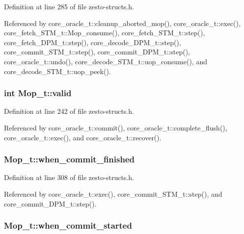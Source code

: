Definition at line 285 of file zesto-structs.h.

Referenced by core\_\-oracle\_\-t::cleanup\_\-aborted\_\-mop(), core\_\-oracle\_\-t::exec(), core\_\-fetch\_\-STM\_\-t::Mop\_\-consume(), core\_\-fetch\_\-STM\_\-t::step(), core\_\-fetch\_\-DPM\_\-t::step(), core\_\-decode\_\-DPM\_\-t::step(), core\_\-commit\_\-STM\_\-t::step(), core\_\-commit\_\-DPM\_\-t::step(), core\_\-oracle\_\-t::undo(), core\_\-decode\_\-STM\_\-t::uop\_\-consume(), and core\_\-decode\_\-STM\_\-t::uop\_\-peek().
\subsubsection[{valid}]{\setlength{\rightskip}{0pt plus 5cm}int {\bf Mop\_\-t::valid}}\label{structMop__t_9de159d013ea3a9cca480a4d459d5eb4}




Definition at line 242 of file zesto-structs.h.

Referenced by core\_\-oracle\_\-t::commit(), core\_\-oracle\_\-t::complete\_\-flush(), core\_\-oracle\_\-t::exec(), and core\_\-oracle\_\-t::recover().
\subsubsection[{when\_\-commit\_\-finished}]{ {\bf Mop\_\-t::when\_\-commit\_\-finished}}\label{structMop__t_e1bbc6ef1aa73472c028b716fc3c5ef8}




Definition at line 308 of file zesto-structs.h.

Referenced by core\_\-oracle\_\-t::exec(), core\_\-commit\_\-STM\_\-t::step(), and core\_\-commit\_\-DPM\_\-t::step().
\subsubsection[{when\_\-commit\_\-started}]{ {\bf Mop\_\-t::when\_\-commit\_\-started}}\label{structMop__t_bb62262ae07e9e18cb4869c709e366ad}




